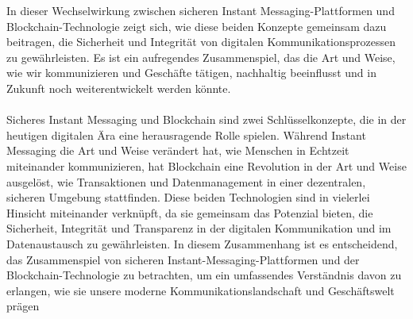 In dieser Wechselwirkung zwischen sicheren Instant Messaging-Plattformen und Blockchain-Technologie zeigt sich, 
wie diese beiden Konzepte gemeinsam dazu beitragen, die Sicherheit und Integrität von digitalen Kommunikationsprozessen 
zu gewährleisten. Es ist ein aufregendes Zusammenspiel, das die Art und Weise, wie wir kommunizieren und Geschäfte tätigen, 
nachhaltig beeinflusst und in Zukunft noch weiterentwickelt werden könnte.
\\
\\
Sicheres Instant Messaging und Blockchain sind zwei Schlüsselkonzepte, die in der heutigen digitalen Ära eine herausragende 
Rolle spielen. Während Instant Messaging die Art und Weise verändert hat, wie Menschen in Echtzeit miteinander kommunizieren, 
hat Blockchain eine Revolution in der Art und Weise ausgelöst, wie Transaktionen und Datenmanagement in einer dezentralen, 
sicheren Umgebung stattfinden. Diese beiden Technologien sind in vielerlei Hinsicht miteinander verknüpft, da sie gemeinsam 
das Potenzial bieten, die Sicherheit, Integrität und Transparenz in der digitalen Kommunikation und im Datenaustausch zu 
gewährleisten. In diesem Zusammenhang ist es entscheidend, das Zusammenspiel von sicheren Instant-Messaging-Plattformen 
und der Blockchain-Technologie zu betrachten, um ein umfassendes Verständnis davon zu erlangen, wie sie unsere moderne 
Kommunikationslandschaft und Geschäftswelt prägen